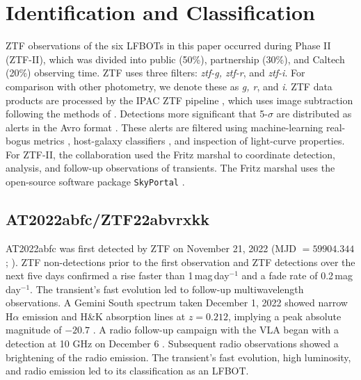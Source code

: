 \documentclass[twocolumn,twocolappendix, linenumbers, trackchanges]{aastex7}
\begin{document}

\appendix

\section{Identification {\bf and Classification}}\label{sec:discovery}

  ZTF observations of the six LFBOTs in this paper occurred during Phase II (ZTF-II), which was divided into public (50\%), partnership (30\%), and Caltech (20\%) observing time.  ZTF uses three filters: {\em ztf-g, ztf-r}, and {\em ztf-i}.  For comparison with other photometry, we denote these as {\em g, r}, and {\em i}.
ZTF data products are processed by the IPAC ZTF pipeline \citep{masci2019}, which uses image subtraction following the methods of \citet{zackay2016}.  Detections more significant that 5-$\sigma$ are distributed as alerts in the Avro format \citep{patterson2019}.  These alerts are filtered using machine-learning real-bogus metrics \citep{mahabal2019, duev2019}, host-galaxy classifiers \citep{tachibana2018}, and inspection of light-curve properties.  For ZTF-II, the collaboration used the Fritz marshal \citep{vanderwalt2019, duev2019} to coordinate detection, analysis, and follow-up observations of transients.  The Fritz marshal uses the open-source software package \texttt{SkyPortal} \citep{coughlin2023}.

\subsection{AT2022abfc/ZTF22abvrxkk}
AT2022abfc was first detected by ZTF on November 21, 2022 (MJD $=59904.344$; \citealt{astro2022abfc_disc}).  ZTF non-detections prior to the first observation and ZTF detections over the next five days confirmed a rise faster than 1\,mag\,day$^{-1}$ and a fade rate of 0.2\,mag\,day$^{-1}$.  The transient's fast evolution led to follow-up multiwavelength observations.  A Gemini South spectrum taken December 1, 2022 showed narrow H$\alpha$ emission and  H\&K absorption lines at $z=0.212$, implying a peak absolute magnitude of $-20.7$ \citep{astro2022abfc_vla}.  A radio follow-up campaign with the VLA %
began with a detection at 10 GHz on December 6 \citep{astro2022abfc_vla}.  Subsequent radio observations showed a brightening of the radio emission.  The transient's fast evolution, high luminosity, and radio emission led to its classification as an LFBOT.
\end{document}
